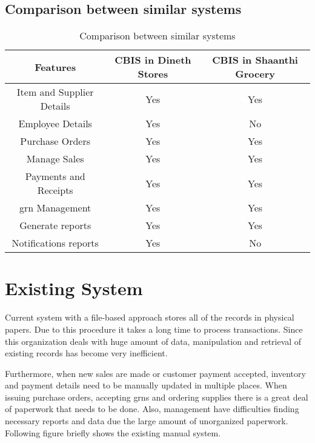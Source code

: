 \documentclass[12pt]{report}
\begin{document}
\subsection{Comparison between similar systems}
\begin{table}[H]
	\centering
	\begin{tabular}{ |c|c|c| }
		\hline
		\bf{Features}             & \bf{CBIS in Dineth Stores} & \bf{CBIS in Shaanthi Grocery} \\
		\hline
		Item and Supplier Details & Yes                        & Yes                           \\
		\hline
		Employee Details          & Yes                        & No                            \\
		\hline
		Purchase Orders           & Yes                        & Yes                           \\
		\hline
		Manage Sales              & Yes                        & Yes                           \\
		\hline
		Payments and Receipts     & Yes                        & Yes                           \\
		\hline
		\acrshort{grn} Management & Yes                        & Yes                           \\
		\hline
		Generate reports          & Yes                        & Yes                           \\
		\hline
		Notifications reports     & Yes                        & No                            \\
		\hline
	\end{tabular}
	\caption{Comparison between similar systems}
\end{table}

\section{Existing System}
Current system with a file-based approach stores all of the records in physical papers. Due to this procedure it takes a long time to process transactions. Since this organization deals with huge amount of data, manipulation and retrieval of existing records has become very inefficient.

Furthermore, when new sales are made or customer payment accepted, inventory and payment details need to be manually updated in multiple places. When issuing purchase orders, accepting \acrshort{grn}s and ordering supplies there is a great deal of paperwork that needs to be done. Also, management have difficulties finding  necessary reports and data due the large amount of unorganized paperwork. Following figure briefly shows the existing manual system.
\end{document}
